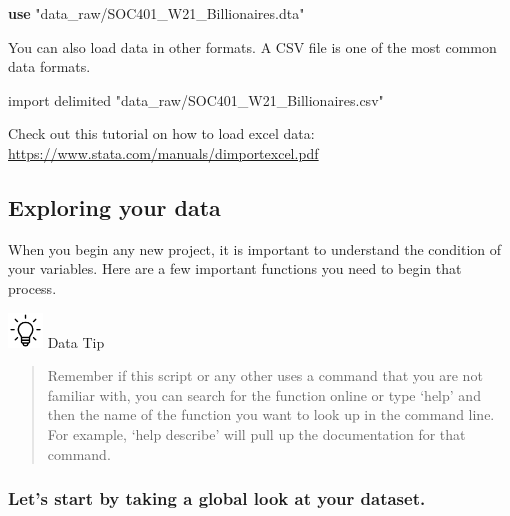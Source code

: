 \documentclass[
]{book}
\newenvironment{Shaded}{\begin{snugshade}}{\end{snugshade}}
\newcommand{\KeywordTok}[1]{\textcolor[rgb]{0.13,0.29,0.53}{\textbf{#1}}}
\newcommand{\NormalTok}[1]{#1}
\newcommand{\StringTok}[1]{\textcolor[rgb]{0.31,0.60,0.02}{#1}}
\begin{document}
\begin{Shaded}
\begin{Highlighting}[]
\KeywordTok{use} \StringTok{"data\_raw/SOC401\_W21\_Billionaires.dta"}
\end{Highlighting}
\end{Shaded}

You can also load data in other formats. A CSV file is one of the most common data formats.

\begin{Shaded}
\begin{Highlighting}[]
\NormalTok{import delimited }\StringTok{"data\_raw/SOC401\_W21\_Billionaires.csv"}
\end{Highlighting}
\end{Shaded}

Check out this tutorial on how to load excel data:
\url{https://www.stata.com/manuals/dimportexcel.pdf}

\hypertarget{exploring-your-data}{%
\subsection*{Exploring your data}\label{exploring-your-data}}

When you begin any new project, it is important to understand the condition of your variables. Here are a few important functions you need to begin that process.

\includegraphics[width=0.36458in,height=\textheight]{images/bulb.png} Data Tip

\begin{quote}
Remember if this script or any other uses a command that you are not familiar with, you can search for the function online or type `help' and then the name of the function you want to look up in the command line. For example, `help describe' will pull up the documentation for that command.
\end{quote}

\hypertarget{describe}{%
\subsubsection*{Let's start by taking a global look at your dataset.}\label{describe}}
\end{document}
